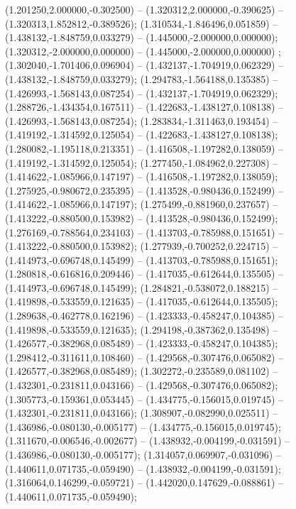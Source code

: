  (1.201250,2.000000,-0.302500) -- (1.320312,2.000000,-0.390625) -- (1.320313,1.852812,-0.389526);
 (1.310534,-1.846496,0.051859) -- (1.438132,-1.848759,0.033279) -- (1.445000,-2.000000,0.000000);
 (1.320312,-2.000000,0.000000) -- (1.445000,-2.000000,0.000000) ;
 (1.302040,-1.701406,0.096904) -- (1.432137,-1.704919,0.062329) -- (1.438132,-1.848759,0.033279);
 (1.294783,-1.564188,0.135385) -- (1.426993,-1.568143,0.087254) -- (1.432137,-1.704919,0.062329);
 (1.288726,-1.434354,0.167511) -- (1.422683,-1.438127,0.108138) -- (1.426993,-1.568143,0.087254);
 (1.283834,-1.311463,0.193454) -- (1.419192,-1.314592,0.125054) -- (1.422683,-1.438127,0.108138);
 (1.280082,-1.195118,0.213351) -- (1.416508,-1.197282,0.138059) -- (1.419192,-1.314592,0.125054);
 (1.277450,-1.084962,0.227308) -- (1.414622,-1.085966,0.147197) -- (1.416508,-1.197282,0.138059);
 (1.275925,-0.980672,0.235395) -- (1.413528,-0.980436,0.152499) -- (1.414622,-1.085966,0.147197);
 (1.275499,-0.881960,0.237657) -- (1.413222,-0.880500,0.153982) -- (1.413528,-0.980436,0.152499);
 (1.276169,-0.788564,0.234103) -- (1.413703,-0.785988,0.151651) -- (1.413222,-0.880500,0.153982);
 (1.277939,-0.700252,0.224715) -- (1.414973,-0.696748,0.145499) -- (1.413703,-0.785988,0.151651);
 (1.280818,-0.616816,0.209446) -- (1.417035,-0.612644,0.135505) -- (1.414973,-0.696748,0.145499);
 (1.284821,-0.538072,0.188215) -- (1.419898,-0.533559,0.121635) -- (1.417035,-0.612644,0.135505);
 (1.289638,-0.462778,0.162196) -- (1.423333,-0.458247,0.104385) -- (1.419898,-0.533559,0.121635);
 (1.294198,-0.387362,0.135498) -- (1.426577,-0.382968,0.085489) -- (1.423333,-0.458247,0.104385);
 (1.298412,-0.311611,0.108460) -- (1.429568,-0.307476,0.065082) -- (1.426577,-0.382968,0.085489);
 (1.302272,-0.235589,0.081102) -- (1.432301,-0.231811,0.043166) -- (1.429568,-0.307476,0.065082);
 (1.305773,-0.159361,0.053445) -- (1.434775,-0.156015,0.019745) -- (1.432301,-0.231811,0.043166);
 (1.308907,-0.082990,0.025511) -- (1.436986,-0.080130,-0.005177) -- (1.434775,-0.156015,0.019745);
 (1.311670,-0.006546,-0.002677) -- (1.438932,-0.004199,-0.031591) -- (1.436986,-0.080130,-0.005177);
 (1.314057,0.069907,-0.031096) -- (1.440611,0.071735,-0.059490) -- (1.438932,-0.004199,-0.031591);
 (1.316064,0.146299,-0.059721) -- (1.442020,0.147629,-0.088861) -- (1.440611,0.071735,-0.059490);
